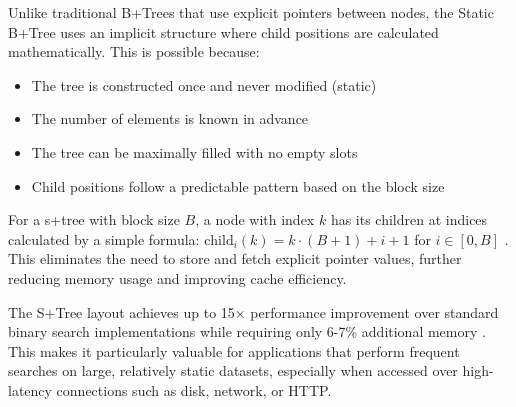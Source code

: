 Unlike traditional B+Trees that use explicit pointers between nodes, the Static B+Tree uses an implicit structure where child positions are calculated mathematically. This is possible because:

\begin{itemize}
    \item The tree is constructed once and never modified (static)
    \item The number of elements is known in advance
    \item The tree can be maximally filled with no empty slots
    \item Child positions follow a predictable pattern based on the block size
\end{itemize}

For a \ac{s+tree} with block size $B$, a node with index $k$ has its children at indices calculated by a simple formula: $\text{child}_i(k) = k \cdot (B+1) + i + 1$ for $i \in [0, B]$ \citep{static_b_trees}. This eliminates the need to store and fetch explicit pointer values, further reducing memory usage and improving cache efficiency.

The S+Tree layout achieves up to 15× performance improvement over standard binary search implementations while requiring only 6-7\% additional memory \citep{static_b_trees}. This makes it particularly valuable for applications that perform frequent searches on large, relatively static datasets, especially when accessed over high-latency connections such as disk, network, or HTTP.
